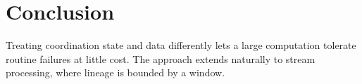 \chapter{Conclusion}
\label{ch:conclusion}

Treating coordination state and data differently lets a large computation tolerate routine
failures at little cost. The approach extends naturally to stream processing, where lineage is
bounded by a window.

